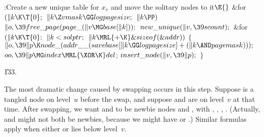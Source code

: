 \B{}:Create a new unique table for $x_v$ and move the solitary nodes
to it\X${}\E{}$\6
\&{for} ${}(\|k\K\T{0};{}$ ${}\|k\Z\\{vmask}\GG\\{logpagesize};{}$ ${}\|k%
\PP){}$\1\5
${}\|o,\39\\{free\_page}(\\{page\_}(\|v\MG\\{base}[\|k]));{}$\2\6
${}\\{new\_unique}(\|v,\39\\{scount});{}$\6
\&{for} ${}(\|k\K\T{0};{}$ ${}\|k<\\{solptr};{}$ ${}\|k\MRL{+{\K}}\&{sizeof}(%
\&{addr})){}$\5
${}\{{}$\1\6
${}\|o,\39\|p\K\\{node\_}(\\{addr\_\_}(\\{savebase}[\|k\GG\\{logpagesize}]+(\|k%
\AND\\{pagemask})));{}$\6
${}\\{oo},\39\|p\MG\\{index}\MRL{{\XOR}{\K}}\\{del}{}$;\6
${}\\{insert\_node}(\|v,\39\|p);{}$\6
\4${}\}{}$\2\par
\U133.\fi

The most dramatic change caused by swapping occurs in this step.
Suppose  is a tangled node on level~$u$ before the swap, and suppose
 and  are on level~$v$ at that
time. After swapping, we want
 and  to be newbie nodes  and %
,
with , , , .
(Actually,  and  might not both be newbies, because
we might have  or .)
Similar formulas apply when either  or  lies below level~$v$.

